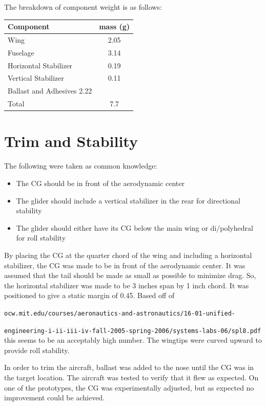 \documentclass{article}
\begin{document}
The breakdown of component weight is as follows:

\begin{tabular}{|l | c|}
\hline
Component & mass (g) \\ \hline
Wing & 2.05\\
Fuselage & 3.14\\
Horizontal Stabilizer & 0.19\\
Vertical Stabilizer & 0.11\\
Ballast and Adhesives 2.22\\ \hline
Total & 7.7\\ \hline
\end{tabular}

\section{Trim and Stability}

The following were taken as common knowledge:
\begin{itemize}
\item The CG should be in front of the aerodynamic center
\item The glider should include a vertical stabilizer in the rear for directional stability
\item The glider should either have its CG below the main wing or di/polyhedral for roll stability
\end{itemize}

By placing the CG at the quarter chord of the wing and including a horizontal stabilizer, the CG was made to be in front of the aerodynamic center.
It was assumed that the tail should be made as small as possible to minimize drag. So, the horizontal stabilizer was made to be 3 inches span by 1
inch chord. It was positioned to give a static margin of 0.45. Based off of

\verb|ocw.mit.edu/courses/aeronautics-and-astronautics/16-01-unified-|

\verb|engineering-i-ii-iii-iv-fall-2005-spring-2006/systems-labs-06/spl8.pdf|
this seems to be an acceptably high number. The wingtips were curved upward to provide roll stability.

In order to trim the aircraft, ballast was added to the nose until the CG was in the target location. The aircraft was tested to verify that it
flew as expected. On one of the prototypes, the CG was experimentally adjusted, but as expected no improvement could be achieved.
\end{document}
